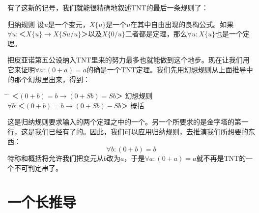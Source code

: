 有了这新的记号，我们就能很精确地叙述TNT的最后一条规则了：
\begin{thm}{归纳规则}
设$u$是一个变元，$X\{u\}$是一个$u$在其中自由出现的良构公式。如果$\forall u:＜X\{u\}→X\{Su/u\}＞$以及$X\{0/u\}$二者都是定理，那么$\forall u:X\{u\}$也是一个定理。
\end{thm}
把皮亚诺第五公设纳入TNT里来的努力最多也就能做到这个地步。现在让我们用它来证明$\forall a:(0+a)=a$的确是一个TNT定理。我们先用幻想规则从上面推导中的那个幻想里出来，得到：
\begin{tabbing*}[]
\indent\indent \= \quad \= \tabindent{-2em} \= \+\kill
$＜(0+b)=b→(0+Sb)=Sb＞$ \>           \>幻想规则\\
$\forall b:＜(0+b)=b→(0+Sb)-Sb＞$ \> \> 概括
\end{tabbing*}

这是归纳规则要求输入的两个定理之中的一个。另一个所要求的是金字塔的第一行，这是我们已经有了的。因此，我们可以应用归纳规则，去推演我们所想要的东西：
\[
\forall b:(0+b)=b
\]
特称和概括将允许我们把变元从$b$改为$a$，于是$\forall a:(0+a)=a$就不再是TNT的一个不可判定串了。

\section{一个长推导}

